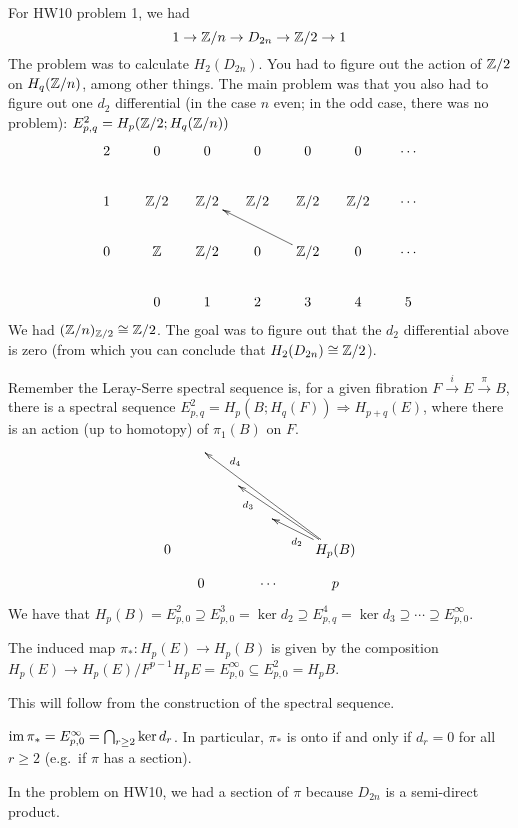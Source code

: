 
For HW10 problem 1, we had
\[
 1\to \mathbb{Z}/n\to D_{2n}\to \mathbb{Z}/2\to 1
\]
The problem was to calculate $H_2(D_{2n})$. You had to figure out the action of $\mathbb{Z}/2$ on $H_q(\mathbb{Z}/n)$, among other things. The main problem was that you also had to figure out one $d_2$ differential (in the case $n$ even; in the odd case, there was no problem): $E^2_{p,q}=H_p(\mathbb{Z}/2;H_q(\mathbb{Z}/n))$
\[\xymatrix @!0 @+1pc{
 2& 0&0&0&0&0&\cdots\\
 1& \ZZ/2 & \ZZ/2& \ZZ/2& \ZZ/2& \ZZ/2 & \cdots\\
 0& \ZZ & \ZZ/2 & 0 & \ZZ/2\ar[ull] & 0 & \cdots\\
 & 0 & 1 & 2 & 3 & 4 & 5
}\]
We had $(\mathbb{Z}/n)_{\mathbb{Z}/2}\cong \mathbb{Z}/2$. The goal was to figure out that the $d_2$ differential above is zero (from which you can conclude that $H_2(D_{2n})\cong \mathbb{Z}/2$).

Remember the Leray-Serre spectral sequence is, for a given fibration $F\xrightarrow i E\xrightarrow \pi B$, there is a spectral sequence $E^2_{p,q}=H_p(B;H_q(F))\Rightarrow H_{p+q}(E)$, where there is an action (up to homotopy) of $\pi_1(B)$ on $F$.
\[\xymatrix @!0 {
  && & & &\\ 
  && & & &\\
  && & & &\\ 
 0& & & & & H_p(B) \ar[ull]^{d_2}\ar[uulll]^(.8){d_3}\ar[uuullll]_(.8){d_4}\\
  & 0 & & \cdots & & p
}\]
We have that $H_p(B)=E^2_{p,0}\supseteq E_{p,0}^3 = \ker d_2\supseteq E^4_{p,q} = \ker d_3\supseteq\cdots \supseteq E^\infty_{p,0}$.
\begin{lemma}
 The induced map $\pi_*\colon H_p(E)\to H_p(B)$ is given by the composition $H_p(E)\to H_p(E)/F^{p-1}H_p E = E^\infty_{p,0}\subseteq E^2_{p,0}=H_p B$.
\end{lemma}
This will follow from the construction of the spectral sequence.
\begin{corollary}
 $\operatorname{im} \pi_* = E_{p,0}^\infty = \bigcap_{r\ge 2}\ker d_r$. In particular, $\pi_*$ is onto if and only if $d_r=0$ for all $r\ge 2$ (e.g.~if $\pi$ has a section).
\end{corollary}
In the problem on HW10, we had a section of $\pi$ because $D_{2n}$ is a semi-direct product.

